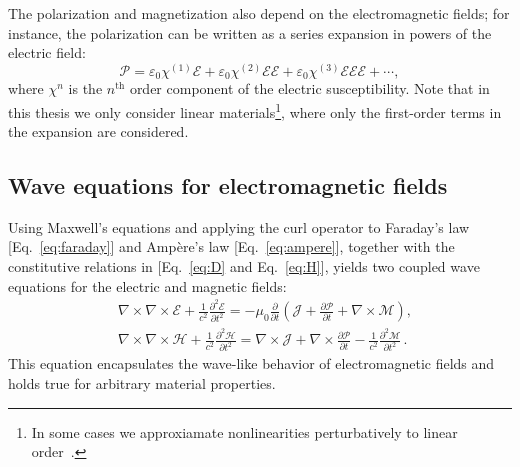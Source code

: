 The polarization and magnetization also depend on the electromagnetic
fields; for instance, the
polarization can be written as a series expansion in powers of the electric
field:
\begin{equation}\label{eq:polarization}
\bm{\mathcal{P}}=\mathcal{\varepsilon}_0 \bm{\mathcal{\chi}}^{(1)}
    \bm{\mathcal{E}}+\mathcal{\varepsilon}_0 \bm{\mathcal{\chi}}^{(2)}
    \bm{\mathcal{E}} \bm{\mathcal{E}}+\mathcal{\varepsilon}_0
    \bm{\mathcal{\chi}}^{(3)} \bm{\mathcal{E}} \bm{\mathcal{E}}
    \bm{\mathcal{E}}+\cdots,
\end{equation}
where $\bm{\mathcal{\chi}}^{n}$ is the $n^\text{th}$ order component of the
electric susceptibility. Note that in this thesis
we only consider linear materials\footnote{In some cases we approxiamate nonlinearities perturbatively to linear
order~\cite{ownpub4}.}, where only the first-order terms in the expansion are
considered. \\

\subsection*{Wave equations for electromagnetic fields}

Using Maxwell's equations and applying the curl operator to Faraday's law
    [Eq.~\eqref{eq:faraday}] and Ampère's law [Eq.~\eqref{eq:ampere}],
together with the constitutive relations in [Eq.~\eqref{eq:D} and
        Eq.~\eqref{eq:H}], yields two coupled
wave equations for the electric and magnetic fields:
\begin{equation}
    \begin{aligned}
         & \nabla \times \nabla \times \bm{\mathcal{E}}+\frac{1}{c^2}
        \frac{\partial^2 \bm{\mathcal{E}}}{\partial t^2}=-\mu_0
        \frac{\partial}{\partial t}\left(\bm{\mathcal{J}}+\frac{\partial
        \bm{\mathcal{P}}}{\partial t}+\nabla \times \bm{\mathcal{M}}\right), \\
         & \nabla \times \nabla \times \bm{\mathcal{H}}+\frac{1}{c^2}
        \frac{\partial^2 \bm{\mathcal{H}}}{\partial t^2}=\nabla \times
        \bm{\mathcal{J}}+\nabla \times \frac{\partial \bm{\mathcal{P}}}{\partial
            t}-\frac{1}{c^2} \frac{\partial^2 \bm{\mathcal{M}}}{\partial t^2}\,.
    \end{aligned}
\end{equation}
This
equation encapsulates the wave-like behavior of electromagnetic fields and
holds true for arbitrary material properties.

